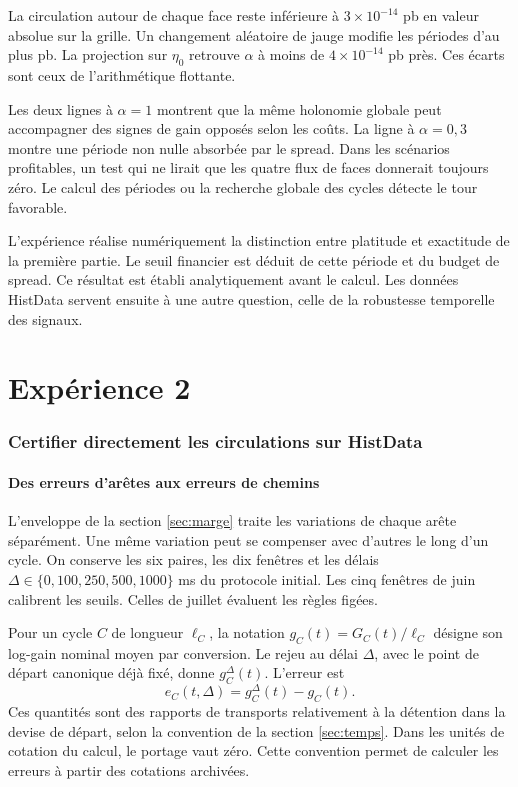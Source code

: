 La circulation autour de chaque face reste inférieure à \(3\times10^{-14}\) pb en valeur absolue sur la grille. Un changement aléatoire de jauge modifie les périodes d'au plus \ExpUnJauge{} pb. La projection sur \(\eta_0\) retrouve \(\alpha\) à moins de \(4\times10^{-14}\) pb près. Ces écarts sont ceux de l'arithmétique flottante.

Les deux lignes à \(\alpha=1\) montrent que la même holonomie globale peut accompagner des signes de gain opposés selon les coûts. La ligne à \(\alpha=0{,}3\) montre une période non nulle absorbée par le spread. Dans les scénarios profitables, un test qui ne lirait que les quatre flux de faces donnerait toujours zéro. Le calcul des périodes ou la recherche globale des cycles détecte le tour favorable.

L'expérience réalise numériquement la distinction entre platitude et exactitude de la première partie. Le seuil financier est déduit de cette période et du budget de spread. Ce résultat est établi analytiquement avant le calcul. Les données HistData servent ensuite à une autre question, celle de la robustesse temporelle des signaux.

\clearpage
\part{Expérience 2}
\section{Certifier directement les circulations sur HistData}
\label{sec:experience-deux}

\subsection{Des erreurs d'arêtes aux erreurs de chemins}

L'enveloppe de la section \ref{sec:marge} traite les variations de chaque arête séparément. Une même variation peut se compenser avec d'autres le long d'un cycle. On conserve les six paires, les dix fenêtres et les délais \(\Delta\in\{0,100,250,500,1000\}\) ms du protocole initial. Les cinq fenêtres de juin calibrent les seuils. Celles de juillet évaluent les règles figées.

Pour un cycle \(C\) de longueur \(\ell_C\), la notation \(g_C(t)=G_C(t)/\ell_C\) désigne son log-gain nominal moyen par conversion. Le rejeu au délai \(\Delta\), avec le point de départ canonique déjà fixé, donne \(g_C^\Delta(t)\). L'erreur est
\[
 e_C(t,\Delta)=g_C^\Delta(t)-g_C(t).
\]
Ces quantités sont des rapports de transports relativement à la détention dans la devise de départ, selon la convention de la section \ref{sec:temps}. Dans les unités de cotation du calcul, le portage vaut zéro. Cette convention permet de calculer les erreurs à partir des cotations archivées.

